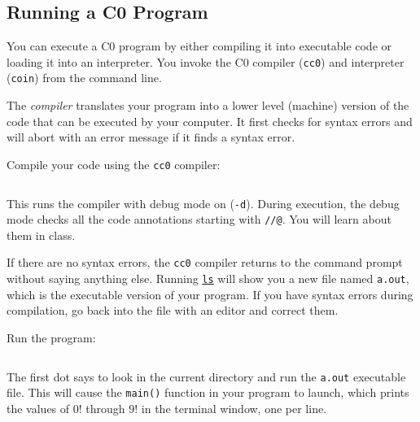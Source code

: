 \subsection*{Running a C0 Program}

You can execute a C0 program by either compiling it into executable
code or loading it into an interpreter.  You invoke the C0 compiler
(\lstinline[language={[coin]C}]'cc0') and interpreter
(\lstinline[language={[coin]C}]'coin') from the command line.

The \emph{compiler} translates your program into a lower level
(machine) version of the code that can be executed by your computer.
It first checks for syntax errors and will abort with an error message
if it finds a syntax error.

\begin{part}
  Compile your code using the \lstinline[language={[coin]C}]'cc0'
  compiler:
\begin{lstlisting}[language={[coin]C}, belowskip=0ex]
   % cc0 -d factorial.c0
\end{lstlisting}
This runs the compiler with debug mode on
(\lstinline[language={[coin]C}]'-d').  During execution, the debug
mode checks all the code annotations starting with \lstinline'//@'.
You will learn about them in class.
\end{part}
\vspace{-2ex}

If there are no syntax errors, the \lstinline[language={[coin]C}]'cc0'
compiler returns to the command prompt without saying anything else.
Running \underline{\lstinline[language={[coin]C}]'ls'} will show you a
new file named \lstinline[language={[coin]C}]'a.out', which is the
executable version of your program. If you have syntax errors during
compilation, go back into the file with an editor and correct them.

\enlargethispage{5ex}
\begin{part}
  Run the program:
\begin{lstlisting}[language={[coin]C}, belowskip=0ex]
  % ./a.out
\end{lstlisting}
The first dot says to look in the current directory and run the
\lstinline[language={[coin]C}]'a.out' executable file. This will cause
the \lstinline'main()' function in your program to launch, which
prints the values of $0!$ through $9!$ in the terminal window, one per
line.
\end{part}
\vspace{-2ex}

